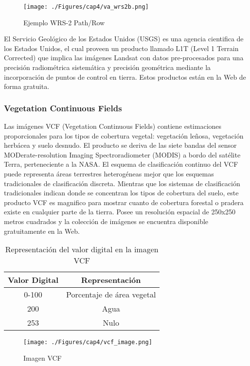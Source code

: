 \begin{figure}[H]
	\centering
	\texttt{[image: ./Figures/cap4/va\_wrs2b.png]}
	\caption{Ejemplo WRS-2 Path/Row}
	\label{fig:wrs2Image}
\end{figure}

El Servicio Geol\'ogico de los Estados Unidos (USGS) es una agencia cientifica de los Estados Unidos, el cual proveen un producto llamado L1T (Level 1 Terrain Corrected) que implica las im\'agenes Landsat con datos pre-procesados para una precisión radiom\'etrica sistem\'atica y precisi\'on geom\'etrica mediante la incorporaci\'on de puntos de control en tierra. Estos productos est\'an en la Web de forma gratuita\cite{landsatNasa}.


\subsubsection{Vegetation Continuous Fields}\label{sec:vcf}
Las im\'agenes VCF (Vegetation Continuous Fields) contiene estimaciones proporcionales para los tipos de cobertura vegetal: vegetaci\'on le\~{n}osa, vegetaci\'on herb\'acea y suelo desnudo. El producto se deriva de las siete bandas del sensor MODerate-resolution Imaging Spectroradiometer (MODIS) a bordo del sat\'elite Terra, perteneciente a la NASA. El esquema de clasificaci\'on continuo del VCF puede representa \'areas terrestres heterog\'eneas mejor que los esquemas tradicionales de clasificaci\'on discreta. Mientras que los sistemas de clasificaci\'on tradicionales indican donde se concentran los tipos de cobertura del suelo, este producto VCF es magnifico para mostrar cuanto de cobertura forestal o pradera existe en cualquier parte de la tierra. Posee un resoluci\'on espacial de 250x250 metros cuadrados y la colecci\'on de im\'agenes se encuentra disponible gratuitamente en la Web\cite{gl2015Uni}.
\begin{table}[htbp]\centering
\begin{tabular}{|c|c|}
	\hline \textbf{Valor Digital} & \textbf{Representaci\'on} \\ 
	\hline 0-100 & Porcentaje de \'area vegetal \\ 
	\hline 200 & Agua \\ 
	\hline 253 & Nulo \\ 
	\hline 
\end{tabular} 
\caption{Representaci\'on del valor digital en la imagen VCF}
\end{table}

\begin{figure}[H]
	\centering
	\texttt{[image: ./Figures/cap4/vcf\_image.png]}
	\caption{Imagen VCF}
	\label{fig:vcfImage}
\end{figure}
